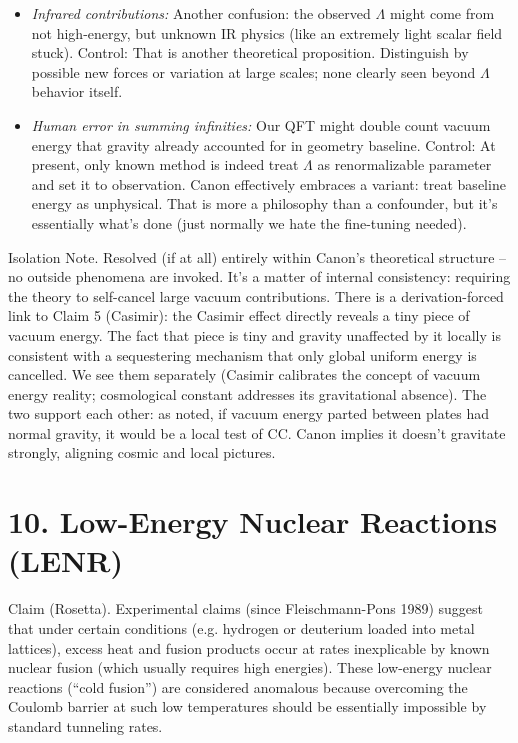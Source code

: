 \documentclass[11pt]{article}
\begin{document}
\begin{itemize}
\item 
\textit{Infrared contributions:} Another confusion: the observed $\Lambda$ might come from not high-energy, but unknown IR physics (like an extremely light scalar field stuck). Control: That is another theoretical proposition. Distinguish by possible new forces or variation at large scales; none clearly seen beyond $\Lambda$ behavior itself.




\item 
\textit{Human error in summing infinities:} Our QFT might double count vacuum energy that gravity already accounted for in geometry baseline. Control: At present, only known method is indeed treat $\Lambda$ as renormalizable parameter and set it to observation. Canon effectively embraces a variant: treat baseline energy as unphysical. That is more a philosophy than a confounder, but it's essentially what’s done (just normally we hate the fine-tuning needed).




\end{itemize}

Isolation Note. Resolved (if at all) entirely within Canon’s theoretical structure – no outside phenomena are invoked. It’s a matter of internal consistency: requiring the theory to self-cancel large vacuum contributions. There is a derivation-forced link to Claim 5 (Casimir): the Casimir effect directly reveals a tiny piece of vacuum energy. The fact that piece is tiny and gravity unaffected by it locally is consistent with a sequestering mechanism that only global uniform energy is cancelled. We see them separately (Casimir calibrates the concept of vacuum energy reality; cosmological constant addresses its gravitational absence). The two support each other: as noted, if vacuum energy parted between plates had normal gravity, it would be a local test of CC. Canon implies it doesn’t gravitate strongly, aligning cosmic and local pictures.


\section*{10. Low-Energy Nuclear Reactions (LENR)}

Claim (Rosetta). Experimental claims (since Fleischmann-Pons 1989) suggest that under certain conditions (e.g. hydrogen or deuterium loaded into metal lattices), excess heat and fusion products occur at rates inexplicable by known nuclear fusion (which usually requires high energies). These low-energy nuclear reactions (“cold fusion”) are considered anomalous because overcoming the Coulomb barrier at such low temperatures should be essentially impossible by standard tunneling rates.
\end{document}
